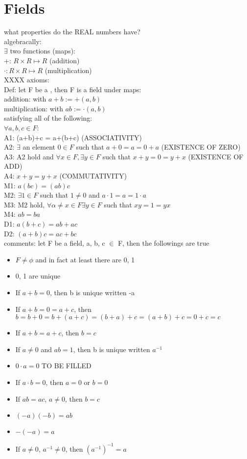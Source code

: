 \documentclass[11pt]{article}
\begin{document}
\doublespacing
\section{Fields}
what properties do the REAL numbers have?\\
algebracally: \\
$\exists$ two functions (maps): \\
+: $R \times R \mapsto R$ (addition) \\
$\cdot : R \times R \mapsto R$ (multiplication)\\
XXXX axioms:\\
Def: let F be a , then F is a field under maps:\\
addition: with $a+b:=+(a, b)$\\
multiplication: with $ab:=\cdot (a, b)$\\
satisfying all of the following:\\
$\forall a, b, c \in F$:\\
A1: (a+b)+c = a+(b+c) (ASSOCIATIVITY)\\
A2: $\exists$ an element $0 \in F$ such that $a+0=a=0+a$ (EXISTENCE OF ZERO)\\
A3: A2 hold and $\forall x \in F, \exists y\in F$ such that $x+y=0=y+x$ (EXISTENCE OF ADD)\\
A4: $x+y=y+x$ (COMMUTATIVITY)\\
M1: $a(bc)=(ab)c$\\
M2: $\exists 1\in F$ such that $1\neq 0$ and $a\cdot 1 = a = 1\cdot a$\\
M3: M2 hold, $\forall \alpha \neq x \in F \exists y \in F$ such that $xy=1=yx$\\
M4: $ab=ba$\\
D1: $a(b+c)=ab+ac$\\
D2: $(a+b)c=ac+bc$\\
comments: let F be a field, a, b, c $\in$ F, then the followings are true\\
\begin{itemize}
\singlespacing
	\item $F \neq \phi$ and in fact at least there are 0, 1
	\item 0, 1 are unique
	\item If $a+b=0$, then b is unique written -a
	\item If $a+b=0=a+c$, then $b=b+0=b+(a+c)=(b+a)+c=(a+b)+c=0+c=c$
	\item If $a+b=a+c$, then $b=c$
	\item If $a \neq 0$ and $ab=1$, then b is unique written $a^{-1}$
	\item $0\cdot a=0$ TO BE FILLED
	\item If $a\cdot b=0$, then $a=0$ or $b=0$
	\item If $ab=ac$, $a\neq 0$, then $b=c$
	\item $(-a)(-b)=ab$
	\item $-(-a)=a$
	\item If $a\neq 0$, $a^{-1}\neq 0$, then $(a^{-1})^{-1}=a$
\end{itemize}
\end{document}
